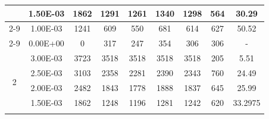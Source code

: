 \begin{table}[H]
{\begin{tabular}{|c|c|c|c|c|c|c|c|c|}
                               & 1.50E-03         & 1862      & 1291                                                       & 1261                                                      & 1340                                                      & 1298    & 564    & 30.29                                                              \\ \cline{2-9}
                               & 1.00E-03         & 1241      & 609                                                        & 550                                                       & 681                                                       & 614     & 627    & 50.52                                                              \\ \cline{2-9}
                               & 0.00E+00         & 0         & 317                                                        & 247                                                       & 354                                                       & 306     & 306    & -                                                                  \\ \hline
            \multirow{6}{*}{2} & 3.00E-03         & 3723      & 3518                                                       & 3518                                                      & 3518                                                      & 3518    & 205    & 5.51                                                               \\ \cline{2-9}
                               & 2.50E-03         & 3103      & 2358                                                       & 2281                                                      & 2390                                                      & 2343    & 760    & 24.49                                                              \\ \cline{2-9}
                               & 2.00E-03         & 2482      & 1843                                                       & 1778                                                      & 1888                                                      & 1837    & 645    & 25.99                                                              \\ \cline{2-9}
                               & 1.50E-03         & 1862      & 1248                                                       & 1196                                                      & 1281                                                      & 1242    & 620    & 33.2975                                                            \\ \cline{2-9}

\end{tabular}}
\end{table}
